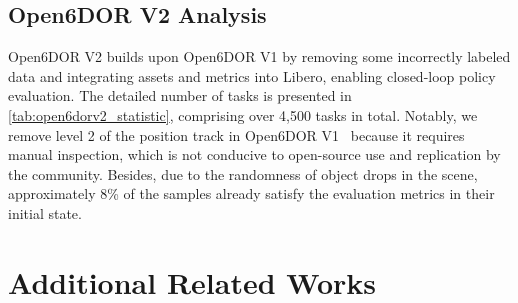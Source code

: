\subsection{Open6DOR V2 Analysis}
Open6DOR V2 builds upon Open6DOR V1 by removing some incorrectly labeled data and integrating assets and metrics into Libero, enabling closed-loop policy evaluation. The detailed number of tasks is presented in \cref{tab:open6dorv2_statistic}, comprising over 4,500 tasks in total. Notably, we remove level 2 of the position track in Open6DOR V1~\cite{Open6DOR24} because it requires manual inspection, which is not conducive to open-source use and replication by the community. Besides, due to the randomness of object drops in the scene, approximately 8\% of the samples already satisfy the evaluation metrics in their initial state.

\vspace{3pt}
\section{Additional Related Works}\label{app:related_work}
